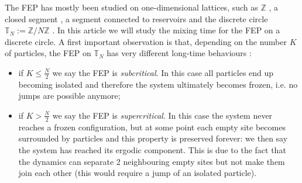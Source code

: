 \documentclass[11pt,a4paper]{article}
\newcommand{\Z}{\mathbb{Z}}
\newcommand{\T}{\mathbb{T}}
\begin{document}
The FEP has mostly been studied on one-dimensional lattices, such as $\Z$ \cite{baik_facilitated_2018, zhao_invariant_2019, goldstein_stationary_2022,erignoux_stationary_2023}, a closed segment \cite{ayre_mixing_2024}, a segment connected to reservoirs \cite{da_cunha_hydrodynamic_2024} and the discrete circle $\T_N:= \Z/N\Z$ \cite{gabel_facilitated_2010,blondel_hydrodynamic_2020,blondel_stefan_2021, ayre_mixing_2024, erignoux_cutoff_2024}.
In this article we will study the mixing time for the FEP on a discrete circle. A first important observation is that,
depending on the number $K$ of particles,  the FEP on $\T_N$ has very different long-time behaviours :
\begin{itemize}
\item  if $K \le \frac{N}{2}$ we say the FEP is \emph{subcritical}. In this case all particles end up becoming isolated and therefore the system ultimately becomes frozen, i.e.  no jumps are possible anymore;
\item if $K > \frac{N}{2}$ we say the FEP is \emph{supercritical}. In this case the system never reaches a frozen configuration, but at some point each empty site becomes surrounded by particles and this property is preserved forever: we then say the system has reached its ergodic component. This is due to the fact that the dynamics can separate 2 neighbouring empty sites but not make them join each other (this would require a jump of an isolated particle).
\end{itemize}
\end{document}
